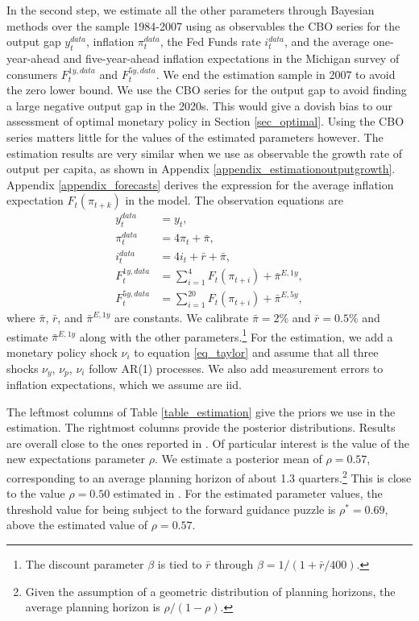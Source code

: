 \documentclass{article}
\begin{document}
In the second step, we estimate all the other parameters through Bayesian methods over the sample 1984-2007 using as observables the CBO series for the output gap $y_t^{data}$, inflation $\pi_t^{data}$, the Fed Funds rate $i_t^{data}$, and the average one-year-ahead and five-year-ahead inflation expectations in the Michigan survey of consumers $F_t^{1y, data}$ and $F_t^{5y, data}$. We end the estimation sample in 2007 to avoid the zero lower bound. We use the CBO series for the output gap to avoid finding a large negative output gap in the 2020s. This would give a dovish bias to our assessment of optimal monetary policy in Section \ref{sec_optimal}. Using the CBO series matters little for the values of the estimated parameters however. The estimation results are very similar when we use as observable the growth rate of output per capita, as shown in Appendix \ref{appendix_estimationoutputgrowth}. Appendix \ref{appendix_forecasts} derives the expression for the average inflation expectation $F_t(\pi_{t+k})$ in the model. The observation equations are
\begin{align}
y_t^{data} &= y_t,\label{eq_obsy}\\
\pi_t^{data} &= 4 \pi_t + \bar{\pi},\\
i_t^{data} &= 4 i_t + \bar{r} + \bar{\pi},\\
F_t^{1y, data} &= \sum_{i=1}^4 F_t(\pi_{t+i})+\bar{\pi}^{E,1y},\\
F_t^{5y, data} &= \sum_{i=1}^{20} F_t(\pi_{t+i})+\bar{\pi}^{E,5y},
\end{align}
where $\bar{\pi}$, $\bar{r}$, and $\bar{\pi}^{E,1y}$ are constants. We calibrate $\bar{\pi}=2\%$ and $\bar{r}=0.5\%$ and estimate $\bar{\pi}^{E,1y}$ along with the other parameters.\footnote{The discount parameter $\beta$ is tied to $\bar{r}$ through $\beta = 1/(1+\bar{r}/400)$.} For the estimation, we add a monetary policy shock $\nu_i$ to equation \eqref{eq_taylor} and assume that all three shocks $\nu_y$, $\nu_p$, $\nu_i$ follow AR(1) processes. We also add measurement errors to inflation expectations, which we assume are iid.

The leftmost columns of Table \ref{table_estimation} give the priors we use in the estimation. The rightmost columns provide the posterior distributions. Results are overall close to the ones reported in \cite{GHLS2020}. Of particular interest is the value of the new expectations parameter $\rho$. We estimate a posterior mean of $\rho=0.57$, corresponding to an average planning horizon of about 1.3 quarters.\footnote{Given the assumption of a geometric distribution of planning horizons, the average planning horizon is $\rho/(1-\rho).$} This is close to the value $\rho=0.50$ estimated in \cite{GHLS2020}. For the estimated parameter values, the threshold value for being subject to the forward guidance puzzle is $\rho^*=0.69$, above the estimated value of $\rho=0.57$.
\end{document}

